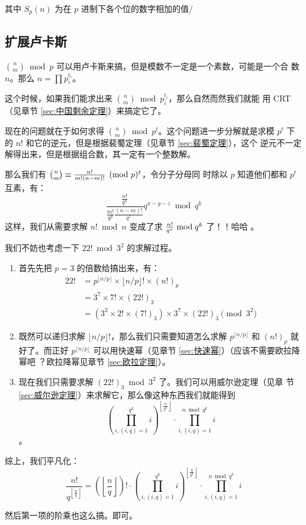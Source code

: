 其中 $S_p(n)$ 为在 $p$ 进制下各个位的数字相加的值/


\subsection{扩展卢卡斯}
${n \choose m} \bmod p$ 可以用卢卡斯来搞，但是模数不一定是一个素数，可能是一个合
数 $n$。那么 $n = \prod p_i^{t_i}$。

这个时候，如果我们能求出来 ${n \choose m} \bmod p_i^{t_i}$，那么自然而然我们就能
用 CRT（见章节 \ref{sec:中国剩余定理}）来搞定它了。

现在的问题就在于如何求得 ${n \choose m} \bmod p^t$。这个问题进一步分解就是求模
$p^t$ 下的 $n!$ 和它的逆元，但是根据裴蜀定理（见章节 \ref{sec:裴蜀定理}），这个
逆元不一定解得出来，但是根据组合数，其一定有一个整数解。

那么我们有 ${n \choose m} \equiv {n! \over m! (n - m)!} \pmod p^t$，令分子分母同
时除以 $p$ 知道他们都和 $p^t$ 互素，有：\[
    \frac{\frac{n!}{q^x}}{\frac{m!}{q^y}\frac{(n-m)!}{q^z}}q^{x-y-z} \bmod q^k
\]
这样，我们从需要求解 $n! \bmod n$ 变成了求 ${n! \over q^x} \bmod q^k$ 了！！哈哈
。

我们不妨也考虑一下 $22! \bmod 3^2$ 的求解过程。
\begin{enumerate}
    \item 首先先把 $p = 3$ 的倍数给搞出来，有：\begin{align*}
        22! & = p^{\lfloor n/p \rfloor} \times \lfloor n/p \rfloor! \times (n!)_p \\
            & = 3^7 \times 7! \times (22!)_3 \\
            & = (3^2 \times 2! \times (7!)_3) \times 3^7 \times (22!)_3 \pmod {3^2}
    \end{align*}
    \item 既然可以递归求解 $\lfloor n/p \rfloor!$，那么我们只需要知道怎么求解
        $p^{\lfloor n/p \rfloor}$ 和 $(n!)_p$ 就好了。而正好 $p^{\lfloor n/p
        \rfloor}$ 可以用快速幂（见章节 \ref{sec:快速幂}）（应该不需要欧拉降幂吧
        ？欧拉降幂见章节 \ref{sec:欧拉定理}）。
    \item 现在我们只需要求解 $(22!)_3 \bmod 3^2$ 了。我们可以用威尔逊定理（见章
        节 \ref{sec:威尔逊定理}）来求解它，那么像这种东西我们就能得到 \[
            {\left(\prod_{i,(i,q)=1}^{q^k}\!\!\!i\right)}^{\left\lfloor\frac{n}{q^k}\right\rfloor}
            \!\!\!
            \cdot \prod_{i,(i,q)=1}^{n\bmod q^k}\!\!\!i
        \]。
\end{enumerate}

综上，我们平凡化：\[ \frac{n!}{q^{\left\lfloor\frac{n}{q}\right\rfloor}} =
    \left(\left\lfloor\frac{n}{q}\right\rfloor\right)! \cdot
    {\left(\prod_{i,(i,q)=1}^{q^k}\!\!\!i\right)}^{\left\lfloor\frac{n}{q^k}\right\rfloor}
    \!\!\!
    \cdot \prod_{i,(i,q)=1}^{n\bmod q^k}\!\!\!i \]

然后第一项的阶乘也这么搞。即可。


